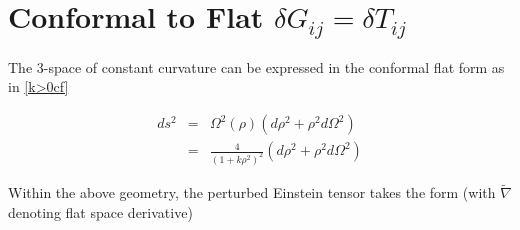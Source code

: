 \documentclass[10pt,letterpaper]{article}
\numberwithin{equation}{section}
\begin{document}
\section{Conformal to Flat $\delta G_{ij} = \delta T_{ij}$}
The 3-space of constant curvature can be expressed in the conformal flat form as in \eqref{k>0cf}

\begin{eqnarray}
ds^2 &=& \Omega^2(\rho)\left( d\rho^2 + \rho^2 d\Omega^2\right)
\nonumber\\
&=& \frac{4}{\left(1+k \rho^2\right)^2}\left( d\rho^2 + \rho^2 d\Omega^2\right)
\label{cfbg}
\end{eqnarray}

Within the above geometry, the perturbed Einstein tensor takes the form (with $\tilde \nabla$ denoting flat space derivative)
\end{document}
